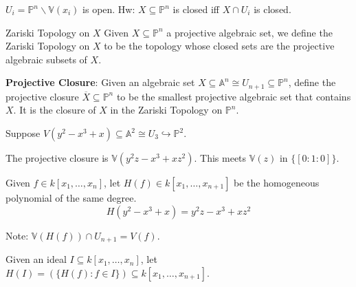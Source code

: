 \documentclass{report}
\begin{document}
\begin{examples}
    \begin{example}
        $U_{i} = \mathbb{P}^{n} \backslash \mathbb{V}(x_{i})$ is open. Hw: $X \subseteq \mathbb{P}^{n}$ is closed iff $X \cap U_{i}$ is closed.
    \end{example} 
\end{examples}

\begin{definition}{Zariski Topology on $X$}
    Given $X \subseteq \mathbb{P}^{n}$ a projective algebraic set, we define the Zariski Topology on $X$ to be the topology whose closed sets are the projective algebraic subsets of $X$.
\end{definition}

\textbf{Projective Closure}: Given an algebraic set $X \subseteq \mathbb{A}^{n} \cong U_{n + 1} \subseteq \mathbb{P}^{n}$, define the projective closure $\overline{X} \subseteq \mathbb{P}^{n}$ to be the smallest projective algebraic set that contains $X$. It is the closure of $X$ in the Zariski Topology on $\mathbb{P}^{n}$.

\begin{examples}
    \begin{example}
        Suppose $V(y^{2} - x^{3} + x) \subseteq \mathbb{A}^{2} \cong U_{3} \hookrightarrow \mathbb{P}^{2}$.
            \begin{fixedfigure}
            \end{fixedfigure}
        The projective closure is $\mathbb{V}(y^{2}z - x^{3} + xz^{2})$. This meets $\mathbb{V}(z)$ in $\{[0 : 1 : 0]\}$.
    \end{example}
\end{examples}

Given $f \in k[x_{1}, \ldots, x_{n}]$, let $H(f) \in k[x_{1}, \ldots, x_{n + 1}]$ be the homogeneous polynomial of the same degree.
    \begin{equation*}
        H(y^{2} - x^{3} + x) = y^{2}z - x^{3} + xz^{2}
    \end{equation*}

Note: $\mathbb{V}(H(f)) \cap U_{n +1} = V(f)$.

Given an ideal $I \subseteq k[x_{1}, \ldots, x_{n}]$, let $H(I) = (\{H(f) : f \in I\}) \subseteq k[x_{1}, \ldots, x_{n + 1}]$.
\end{document}
